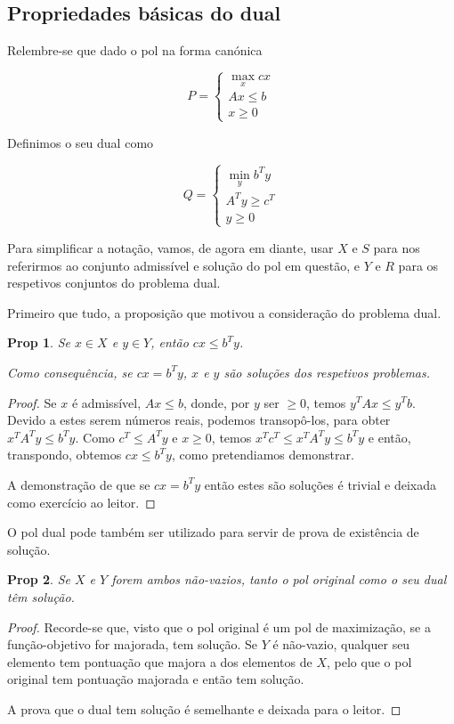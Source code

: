 \documentclass{article}
\newtheorem{prop}{Prop}
\theoremstyle{definition}
\begin{document}
	\subsection{Propriedades básicas do dual}
	
	Relembre-se que dado o pol na forma canónica
	
	\[
	P =
	\begin{cases}
	\max\limits_x cx\\
	Ax \leq b\\
	x \geq 0
	\end{cases}
	\]
	
	Definimos o seu dual como
	
	\[
	Q =
	\begin{cases}
	\min\limits_y b^T y\\
	A^T y \geq c^T\\
	y \geq 0
	\end{cases}
	\]
	
	Para simplificar a notação, vamos, de agora em diante, usar $X$ e $S$ para nos referirmos ao conjunto admissível e solução do pol em questão, e $Y$ e $R$ para os respetivos conjuntos do problema dual.
	
	Primeiro que tudo, a proposição que motivou a consideração do problema dual.
	
	\begin{prop}
	Se $x \in X$ e $y \in Y$, então $cx \leq b^T y$.
	
	Como consequência, se $cx = b^T y$, $x$ e $y$ são soluções dos respetivos problemas.
	\end{prop}
	
	\begin{proof}
	Se $x$ é admissível, $Ax \leq b$, donde, por $y$ ser $\geq 0$, temos $y^T A x \leq y^T b$. Devido a estes serem números reais, podemos transopô-los, para obter $x^T A^T y \leq b^T y$. Como $c^T \leq A^T y$ e $x \geq 0$, temos $x^T c^T \leq x^T A^T y \leq b^T y$ e então, transpondo, obtemos $cx \leq b^T y$, como pretendiamos demonstrar.
	
	A demonstração de que se $cx = b^T y$ então estes são soluções é trivial e deixada como exercício ao leitor.
	\end{proof}
	
	O pol dual pode também ser utilizado para servir de prova de existência de solução.
	
	\begin{prop}
	Se $X$ e $Y$ forem ambos não-vazios, tanto o pol original como o seu dual têm solução.
	\end{prop}
	
	\begin{proof}
	Recorde-se que, visto que o pol original é um pol de maximização, se a função-objetivo for majorada, tem solução. Se $Y$ é não-vazio, qualquer seu elemento tem pontuação que majora a dos elementos de $X$, pelo que o pol original tem pontuação majorada e então tem solução.
	
	A prova que o dual tem solução é semelhante e deixada para o leitor.
	\end{proof}
	
	
\end{document}

